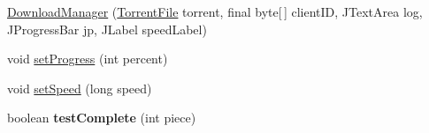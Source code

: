 \begin{DoxyCompactItemize}
\item 
\hyperlink{classj_bittorrent_a_p_i_1_1_download_manager_a8fd6a72325826a055cf5a7c85d80830a}{DownloadManager} (\hyperlink{classj_bittorrent_a_p_i_1_1_torrent_file}{TorrentFile} torrent, final byte\mbox{[}$\,$\mbox{]} clientID, JTextArea log, JProgressBar jp, JLabel speedLabel)
\item 
void \hyperlink{classj_bittorrent_a_p_i_1_1_download_manager_a938bc914b3c42f488705aa8e6c5d0ae8}{setProgress} (int percent)
\item 
void \hyperlink{classj_bittorrent_a_p_i_1_1_download_manager_a2ddf8d8a8c0c6e862cc861aded87e0a2}{setSpeed} (long speed)
\item 
\hypertarget{classj_bittorrent_a_p_i_1_1_download_manager_a5d26bedd9e30749e06f4b0a0996b626d}{
boolean {\bfseries testComplete} (int piece)}
\label{classj_bittorrent_a_p_i_1_1_download_manager_a5d26bedd9e30749e06f4b0a0996b626d}


\end{DoxyCompactItemize}
